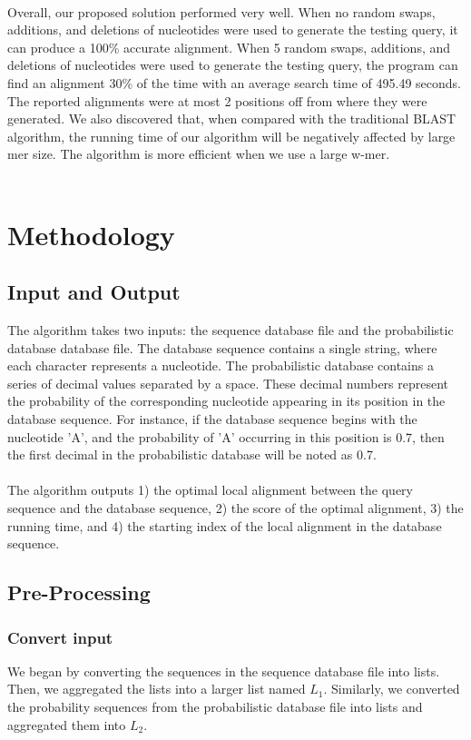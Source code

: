 \documentclass{article}
\begin{document}
\\
Overall, our proposed solution performed very well. When no random swaps, additions, and deletions of nucleotides were used to generate the testing query, it can produce a 100\% accurate alignment. When 5 random swaps, additions, and deletions of nucleotides were used to generate the testing query, the program can find an alignment 30\% of the time with an average search time of 495.49 seconds. The reported alignments were at most 2 positions off from where they were generated. We also discovered that, when compared with the traditional BLAST algorithm, the running time of our algorithm will be negatively affected by large mer size. The algorithm is more efficient when we use a large w-mer.\\
\\


\section*{Methodology}
\subsection*{Input and Output}
The algorithm takes two inputs: the sequence database file and the probabilistic database database file. The database sequence contains a single string, where each character represents a nucleotide. The probabilistic database contains a series of decimal values separated by a space. These decimal numbers represent the probability of the corresponding nucleotide appearing in its position in the database sequence. For instance, if the database sequence begins with the nucleotide 'A', and the probability of 'A' occurring in this position is 0.7, then the first decimal in the probabilistic database will be noted as 0.7. \\
\\
The algorithm outputs 1) the optimal local alignment between the query sequence and the database sequence, 2) the score of the optimal alignment, 3) the running time, and 4) the starting index of the local alignment in the database sequence.\\

\subsection*{Pre-Processing}
\subsubsection*{Convert input}
We began by converting the sequences in the sequence database file into lists. Then, we aggregated the lists into a larger list named $L_1$. Similarly, we converted the probability sequences from the probabilistic database file into lists and aggregated them into $L_2$.
\end{document}
